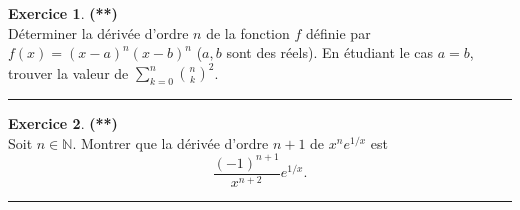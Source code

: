 \documentclass[a4paper,11pt]{article}
\theoremstyle{definition}
\newtheorem{exo}{Exercice} %
\begin{document}
\begin{exo}\textbf{(**)}\quad\\[0.25cm]
Déterminer la dérivée d'ordre $n$ de la fonction $f$ définie par $f(x)=(x-a)^n (x-b)^n$
($a,b$ sont des réels). En étudiant le cas $a=b$, trouver la valeur de $\sum_{k=0}^n \binom{n}{k}^2$.
	
	\centering
	\rule{1\linewidth}{0.6pt}
\end{exo}


\begin{exo}\textbf{(**)}\quad\\[0.25cm]
Soit $n\in\mathbb N$. Montrer que la dérivée d'ordre $n+1$ de $x^ne^{1/x}$ est
$$\frac{(-1)^{n+1}}{x^{n+2}}e^{1/x}.$$
	
	\centering
	\rule{1\linewidth}{0.6pt}
\end{exo}
\end{document}
